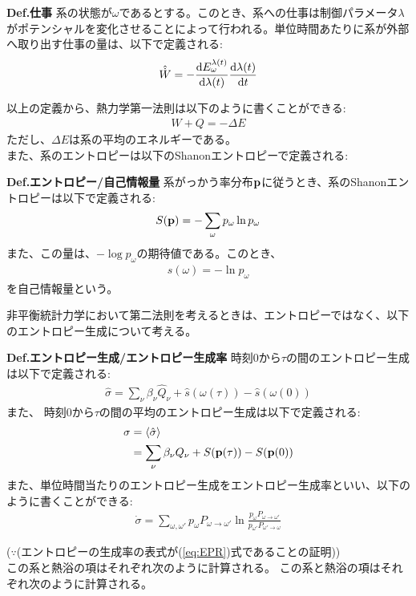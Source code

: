 \documentclass[a4paper,11pt]{jsarticle}
\numberwithin{equation}{section}
\begin{document}
\begin{itembox}[l]{\textbf{Def.仕事}}
  系の状態が$\omega$であるとする。このとき、系への仕事は制御パラメータ$\lambda$がポテンシャルを変化させることによって行われる。単位時間あたりに系が外部へ取り出す仕事の量は、以下で定義される:
  \begin{align}
    \hat{\dot{W}} = -\dv{E^{\lambda(t)}_{\omega}}{\lambda(t)}\dv{\lambda(t)}{t}
  \end{align}
\end{itembox}
以上の定義から、熱力学第一法則は以下のように書くことができる:
\begin{align}
  W + Q = -\Delta E
\end{align}
ただし、$\Delta E$は系の平均のエネルギーである。\\

また、系のエントロピーは以下のShanonエントロピーで定義される:

\begin{itembox}[l]{\textbf{Def.エントロピー/自己情報量}}
  系がっかう率分布$\vb{p}$に従うとき、系のShanonエントロピーは以下で定義される:
  \begin{align}
    S(\vb{p}) = -\sum_{\omega}p_{\omega}\ln p_{\omega}
  \end{align}
  また、この量は、$-\log p_{\omega}$の期待値である。このとき、
  \begin{align}
    s(\omega) = -\ln p_{\omega}
  \end{align}
  を自己情報量という。
\end{itembox}


非平衡統計力学において第二法則を考えるときは、エントロピーではなく、以下のエントロピー生成について考える。\\
\begin{itembox}[l]{\textbf{Def.エントロピー生成/エントロピー生成率}}
  時刻$0$から$\tau$の間のエントロピー生成は以下で定義される:
  \begin{align}
    \hat{\sigma} = \sum_{\nu} \beta_{\nu}\hat{Q}_{\nu} + \hat{s}(\omega(\tau)) - \hat{s}(\omega(0))
  \end{align}
  また、  時刻$0$から$\tau$の間の平均のエントロピー生成は以下で定義される:
  \begin{align}
    \sigma &= \expval{\hat{\sigma}}\\
    &= \sum_{\nu} \beta_{\nu} Q_{\nu} + S(\vb{p}(\tau)) - S(\vb{p}(0))
  \end{align}
  また、単位時間当たりのエントロピー生成をエントロピー生成率といい、以下のように書くことができる:
  \begin{align}
    \dot{\sigma} = \sum_{\omega,\omega'}p_{\omega}P_{\omega \to \omega'}\ln \frac{p_{\omega}P_{\omega \to \omega'}}{p_{\omega'}P_{\omega' \to \omega}} \label{eq:EPR}
  \end{align}
\end{itembox}
($\because$(エントロピーの生成率の表式が(\ref{eq:EPR})式であることの証明))\\
この系と熱浴の項はそれぞれ次のように計算される。
この系と熱浴の項はそれぞれ次のように計算される。
\end{document}
